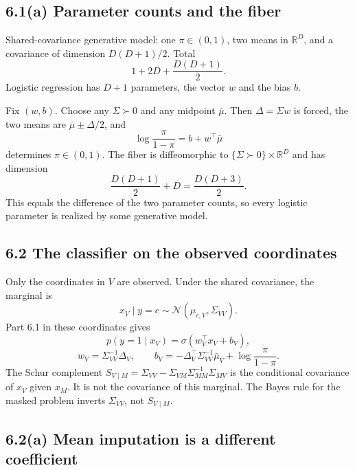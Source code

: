 \documentclass[11pt]{article}
\theoremstyle{remark}
\newcommand{\R}{\mathbb{R}}
\newcommand{\N}{\mathcal{N}}
\begin{document}
\subsection*{6.1(a) Parameter counts and the fiber}

Shared-covariance generative model: one \(\pi\in(0,1)\), two means in \(\R^D\), and a covariance of dimension \(D(D+1)/2\). Total
\[
1+2D+\frac{D(D+1)}{2}.
\]
Logistic regression has \(D+1\) parameters, the vector \(w\) and the bias \(b\).

Fix \((w,b)\). Choose any \(\Sigma\succ 0\) and any midpoint \(\bar\mu\). Then \(\Delta=\Sigma w\) is forced, the two means are \(\bar\mu\pm\Delta/2\), and
\[
\log\frac{\pi}{1-\pi}=b+w^\top\bar\mu
\]
determines \(\pi\in(0,1)\). The fiber is diffeomorphic to \(\{\Sigma\succ 0\}\times\R^D\) and has dimension
\[
\frac{D(D+1)}{2}+D=\frac{D(D+3)}{2}.
\]
This equals the difference of the two parameter counts, so every logistic parameter is realized by some generative model.

\subsection*{6.2 The classifier on the observed coordinates}

Only the coordinates in \(V\) are observed. Under the shared covariance, the marginal is
\[
x_V\mid y=c\sim\N(\mu_{c,V},\Sigma_{VV}).
\]
Part 6.1 in these coordinates gives
\[
p(y=1\mid x_V)=\sigma(w_V^\top x_V+b_V),
\]
\[
w_V=\Sigma_{VV}^{-1}\Delta_V,\qquad
b_V=-\Delta_V^\top\Sigma_{VV}^{-1}\bar\mu_V+\log\frac{\pi}{1-\pi}.
\]
The Schur complement \(S_{V\mid M}=\Sigma_{VV}-\Sigma_{VM}\Sigma_{MM}^{-1}\Sigma_{MV}\) is the conditional covariance of \(x_V\) given \(x_M\). It is not the covariance of this marginal. The Bayes rule for the masked problem inverts \(\Sigma_{VV}\), not \(S_{V\mid M}\).

\subsection*{6.2(a) Mean imputation is a different coefficient}
\end{document}
